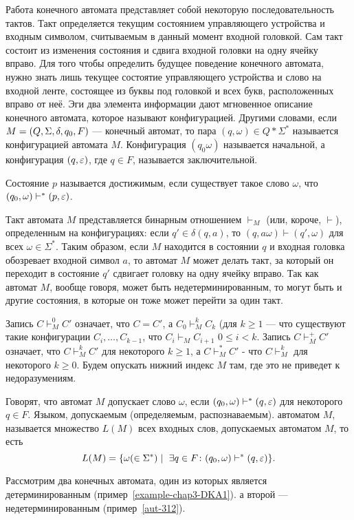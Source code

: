 Работа конечного автомата представляет собой некоторую последовательность тактов. Такт определяется текущим состоянием управляющего устройства и входным символом, считываемым в данный момент входной головкой. Сам такт состоит из изменения состояния и сдвига входной головки на одну ячейку вправо. Для того чтобы определить будущее поведение конечного автомата, нужно знать лишь текущее состоятие управляющего устройства и слово на входной ленте, состоящее из буквы под головкой и всех букв, расположенных вправо от неё. Эги два элемента информации дают мгновенное описание конечного автомата, которое называют конфигурацией. Другими словами, если $M = (Q,\\ \Sigma, \delta, q_0, F)$ --- конечный автомат, то пара $(q,\omega)\in Q*\Sigma^*$ называется конфигурацией автомата $M$. Конфигурация $(q_0\omega)$ называется начальной, а конфигурация $(q,\varepsilon)$, где $q\in F$, называется заключительной.

Состояние $p$ называется достижимым, если существует такое слово $\omega$, что $(q_0,\omega)\vdash^*(p,\varepsilon)$.

Такт автомата $M$ представляется бинарным отношением $\vdash_M$ (или, короче, $\vdash$), определенным на конфигурациях: если $q'\in\delta(q,a)$, то $(q,a\omega)\vdash(q',\omega)$ для всех $\omega\in\Sigma^*$. Таким образом, если $M$ находится в состоянии $q$ и входная головка обозревает входной символ $a$, то автомат $M$ может делать такт, за который он переходит в состояние $q'$ сдвигает головку на одну ячейку вправо. Так как автомат $M$, вообще говоря, может быть недетерминированным, то могут быть и другие состояния, в которые он тоже может перейти за один такт.

Запись $C\vdash_M^0 C'$ означает, что $C=C'$, а $C_0\vdash_M^kC_k$ (для $k\ge 1$ --- что существуют такие конфигурации $C_i, \ldots ,C_{k-1}$, что $C_i\vdash_MC_{i+1}$ $0\le i<k$. Запись $C\vdash_M^+C'$ означает, что $C\vdash_M^kC'$ для некоторого $k\ge 1$, а $C\vdash_M^*C'$ - что $C\vdash_M^k$ для некоторого $k\ge 0$. Будем опускать нижний индекс $M$ там, где это не приведет к недоразумениям.

Говорят, что автомат $M$ допускает слово $\omega$, если $(q_0,\omega)\vdash^*(q,\varepsilon)$ для некоторого $q\in F$. Языком, допускаемым (определяемым, распознаваемым). автоматом $M$, называется множество $L(M)$ всех входных слов, допускаемых автоматом $M$, то есть
\[
	L(M)=\{\omega(\in\Sigma^*)\mid~\exists q\in F\colon (q_0,\omega)\vdash^*(q,\varepsilon)\}.
\]

Рассмотрим два конечных автомата, один из которых является детерминированным (пример~\ref{example-chap3-DKA1}). а второй --- недетерминированным (пример~\ref{aut-312}).

